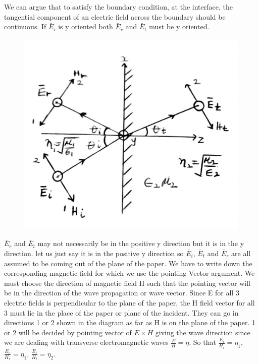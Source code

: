 We can argue that to satisfy the boundary condition, at the interface, the tangential component of an electric field across the boundary should be continuous. If $\bar{E}_{i}$ is y oriented both  $\bar{E}_{r}$ and  $\bar{E}_{t}$ must be y oriented.
\begin{figure}[h]
\centering
\includegraphics[scale=0.2]{./graphics/13}
\caption{}
\label{fig:13}
\end{figure}

$\bar{E}_{r}$ and  $\bar{E}_{t}$ may not necessarily be in the positive y direction but it is in the y direction. let us just say it is in the positive y direction so  $\bar{E}_{i}$,  $\bar{E}_{t}$ and  $\bar{E}_{r}$ are all assumed to be coming out of the plane of the paper. We have to write down the corresponding magnetic field for which we use the pointing Vector argument. We must choose the direction of magnetic field H such that the pointing vector will be in the direction of the wave propagation or wave vector. Since E for all 3 electric fields is perpendicular to the plane of the paper, the H field vector for all 3 must lie in the place of the paper or plane of the incident. They can go in directions 1 or 2 shown in the diagram as far as H is on the plane of the paper. 1 or 2 will be decided by pointing vector of  $\bar{E} \times \bar{H}$ giving the wave direction since we are dealing with transverse electromagnetic waves $\frac{E}{H} = \eta$. So that $\frac{E_{i}}{H_{i}} = \eta_{1}$, $\frac{E_{r}}{H_{r}} = \eta_{1}$, $\frac{E_{t}}{H_{t}} = \eta_{2}$.

